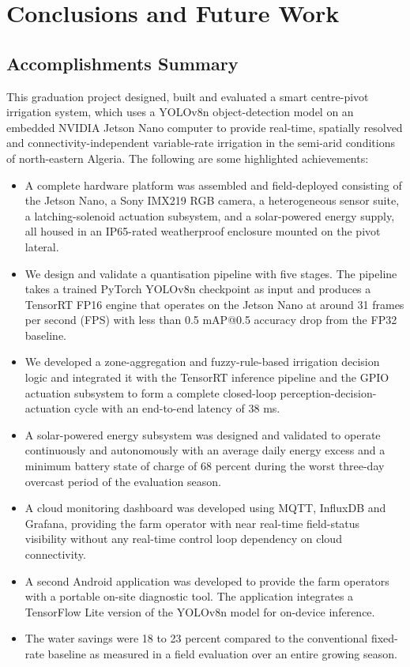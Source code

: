 \documentclass[12pt,a4paper]{report}
\begin{document}
\chapter{Conclusions and Future Work}
\pagestyle{fancy}
\thispagestyle{empty}

\section{Accomplishments Summary}

This graduation project designed, built and evaluated a smart centre-pivot irrigation system, which uses a YOLOv8n object-detection model on an embedded NVIDIA Jetson Nano computer to provide real-time, spatially resolved and connectivity-independent variable-rate irrigation in the semi-arid conditions of north-eastern Algeria. The following are some highlighted achievements:

\begin{itemize}
    \item A complete hardware platform was assembled and field-deployed consisting of the Jetson Nano, a Sony IMX219 RGB camera, a heterogeneous sensor suite, a latching-solenoid actuation subsystem, and a solar-powered energy supply, all housed in an IP65-rated weatherproof enclosure mounted on the pivot lateral.
    \item We design and validate a quantisation pipeline with five stages. The pipeline takes a trained PyTorch YOLOv8n checkpoint as input and produces a TensorRT FP16 engine that operates on the Jetson Nano at around 31 frames per second (FPS) with less than 0.5 mAP@0.5 accuracy drop from the FP32 baseline.
    \item We developed a zone-aggregation and fuzzy-rule-based irrigation decision logic and integrated it with the TensorRT inference pipeline and the GPIO actuation subsystem to form a complete closed-loop perception-decision-actuation cycle with an end-to-end latency of 38 ms.
    \item A solar-powered energy subsystem was designed and validated to operate continuously and autonomously with an average daily energy excess and a minimum battery state of charge of 68 percent during the worst three-day overcast period of the evaluation season.
    \item A cloud monitoring dashboard was developed using MQTT, InfluxDB and Grafana, providing the farm operator with near real-time field-status visibility without any real-time control loop dependency on cloud connectivity.
    \item A second Android application was developed to provide the farm operators with a portable on-site diagnostic tool. The application integrates a TensorFlow Lite version of the YOLOv8n model for on-device inference.
    \item The water savings were 18 to 23 percent compared to the conventional fixed-rate baseline as measured in a field evaluation over an entire growing season.
\end{itemize}
\end{document}
